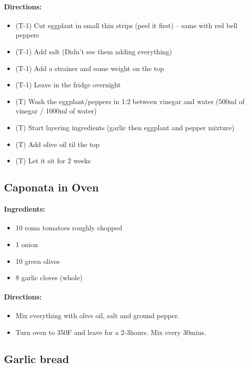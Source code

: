 \documentclass{article}
\begin{document}
\paragraph{Directions:}
\begin{itemize}
    \item (T-1) Cut eggplant in small thin strips (peel it first) -- same with red bell peppers
    \item (T-1) Add salt (Didn't see them adding everything)
    \item (T-1) Add a strainer and some weight on the top
    \item (T-1) Leave in the fridge overnight
    \item (T) Wash the eggplant/peppers in 1:2 between vinegar and water (500ml of vinegar / 1000ml of water)
    \item (T) Start layering ingredients (garlic then eggplant and pepper mixture)
    \item (T) Add olive oil til the top
    \item (T) Let it sit for 2 weeks
\end{itemize}

\subsection{Caponata in Oven}

\paragraph{Ingredients:}
\begin{itemize}
    \item 10 roma tomatoes roughly chopped
    \item 1 onion
    \item 10 green olives
    \item 8 garlic cloves (whole)
\end{itemize}

\paragraph{Directions:}
\begin{itemize}
    \item Mix everything with olive oil, salt and ground pepper.
    \item Turn oven to 350F and leave for a 2-3hours. Mix every 30mins.
\end{itemize}

\subsection{Garlic bread}
\end{document}
